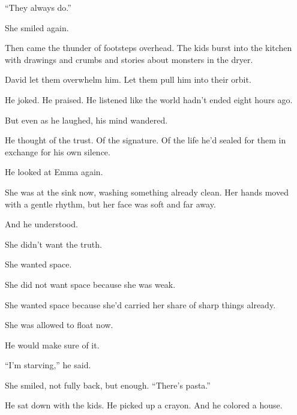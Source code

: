 ``They always do.''

She smiled again.

Then came the thunder of footsteps overhead. The kids burst into the kitchen with drawings and crumbs 
and stories about monsters in the dryer.

David let them overwhelm him. Let them pull him into their orbit.

He joked. He praised. He listened like the world hadn’t ended eight hours ago.

But even as he laughed, his mind wandered.

He thought of the trust.
Of the signature.
Of the life he’d sealed for them in exchange for his own silence.

He looked at Emma again.

She was at the sink now, washing something already clean. Her hands moved with a gentle rhythm, 
but her face was soft and far away.

And he understood.

She didn’t want the truth.

She wanted space.

She did not want space because she was weak.

She wanted space because she’d carried her share of sharp things already. 

She was allowed to float now. 

He would make sure of it.

``I’m starving,'' he said.

She smiled, not fully back, but enough. ``There’s pasta.''

He sat down with the kids. He picked up a crayon. And he colored a house.

\medskip

